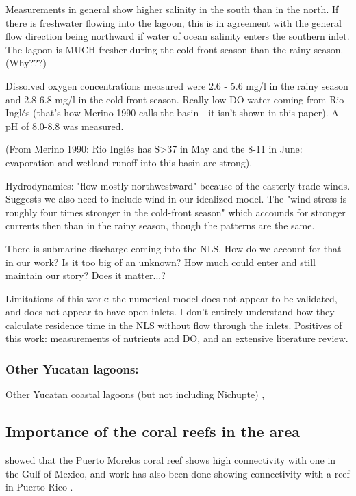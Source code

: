 \documentclass[11pt]{article}
\begin{document}
Measurements in general show higher salinity in the south than in the north. If there is freshwater flowing into the lagoon, this is in agreement with the general flow direction being northward if water of ocean salinity enters the southern inlet. The lagoon is MUCH fresher during the cold-front season than the rainy season. (Why???) 

Dissolved oxygen concentrations measured were 2.6 - 5.6 mg/l in the rainy season and 2.8-6.8 mg/l in the cold-front season. Really low DO water coming from Rio Inglés (that's how Merino 1990 calls the basin - it isn't shown in this paper). A pH of 8.0-8.8 was measured. 

(From Merino 1990: Rio Inglés has S>37 in May and the 8-11 in June: evaporation and wetland runoff into this basin are strong).

Hydrodynamics: "flow mostly northwestward" because of the easterly trade winds. Suggests we also need to include wind in our idealized model. The "wind stress is roughly four times stronger in the cold-front season" which accounds for stronger currents then than in the rainy season, though the patterns are the same.

There is submarine discharge coming into the NLS. How do we account for that in our work? Is it too big of an unknown? How much could enter and still maintain our story? Does it matter...?

Limitations of this work: the numerical model does not appear to be validated, and does not appear to have open inlets. I don't entirely understand how they calculate residence time in the NLS without flow through the inlets. Positives of this work: measurements of nutrients and DO, and an extensive literature review.  

\subsubsection*{Other Yucatan lagoons:}
Other Yucatan coastal lagoons (but not including Nichupte) \citep{herrerasilveria98}, 


\subsection*{Importance of the coral reefs in the area}

\citet{villegassanchez14} showed that the Puerto Morelos coral reef shows high connectivity with one in the Gulf of Mexico, and work has also been done showing connectivity with a reef in Puerto Rico \citep{labastidaestrada14}.
\end{document}
